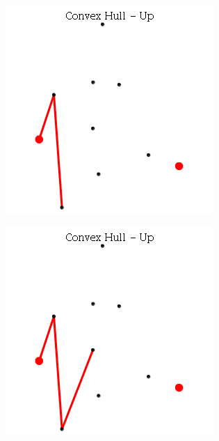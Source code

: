 \documentclass[12pt]{article}
\begin{document}
          \begin{figure}[h]
            \centering
            \begin{subfigure}[h]{0.3\linewidth}
              \includegraphics[width=\linewidth]{GIF/Up-2}
              \caption{}
            \end{subfigure}
            \begin{subfigure}[h]{0.3\linewidth}
              \includegraphics[width=\linewidth]{GIF/Up-3}

\end{subfigure}
\end{figure}
\end{document}
